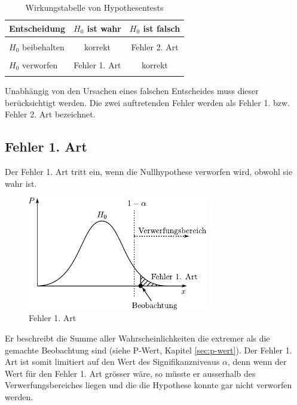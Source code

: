 \begin{table}[h!]
	\centering
	\begin{tabular}{l c c}
		Entscheidung
			& $H_0$ ist wahr 
			& $H_0$ ist falsch \\
		\hline
		&& \\
		$H_0$ beibehalten 
			& korrekt 
			& Fehler 2. Art \\
		&& \\
		$H_0$ verworfen 
			& Fehler 1. Art 
			& korrekt \\
		&& \\
	\end{tabular}
	\caption{Wirkungstabelle von Hypothesentests}
	\label{tab:wirkungstabelle}
\end{table}

Unabhängig von den Ursachen eines falschen Entscheides muss dieser 
berücksichtigt werden. Die zwei auftretenden Fehler werden als
Fehler 1. bzw. Fehler 2. Art bezeichnet.

\subsection{Fehler 1. Art}
Der Fehler 1. Art tritt ein, wenn die Nullhypothese verworfen wird, obwohl 
sie wahr ist. 

\begin{figure}[h!]
	\centering
        \includegraphics[width=0.7\textwidth]{fehler-erster-art.pdf}
	\caption{Fehler 1. Art}
	\label{fig:fehler1}
\end{figure}

Er beschreibt die Summe aller Wahrscheinlichkeiten die extremer als die 
gemachte Beobachtung sind (siehe P-Wert, Kapitel \ref{sec:p-wert}). 
Der Fehler 1. Art ist somit limitiert auf den Wert des Signifikanzniveaus 
$\alpha$, denn wenn der Wert für den Fehler 1. Art grösser wäre, so müsste 
er ausserhalb des Verwerfungsbereiches liegen und die die Hypothese konnte 
gar nicht verworfen werden.

